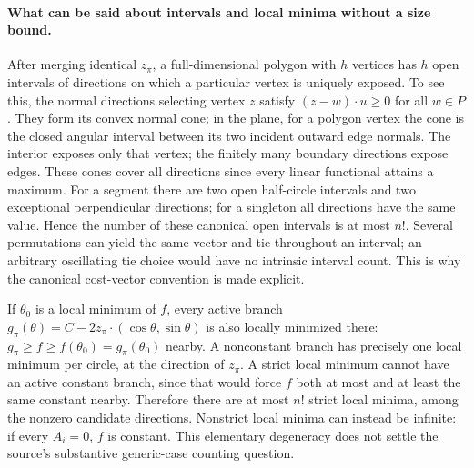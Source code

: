 \documentclass[11pt]{article}
\begin{document}
\paragraph{What can be said about intervals and local minima without a size bound.}
After merging identical $z_\pi$, a full-dimensional polygon with $h$ vertices
has $h$ open intervals of directions on which a particular vertex is uniquely
exposed. To see this, the normal directions selecting vertex $z$ satisfy
$(z-w)\cdot u\ge0$ for all $w\in P$. They form its convex normal cone;
in the plane, for a polygon vertex the cone is the closed angular interval
between its two incident outward edge normals. The interior exposes only
that vertex; the finitely many boundary directions expose edges. These cones
cover all directions since every linear functional attains a maximum. For
a segment there are two open half-circle intervals and two exceptional
perpendicular directions; for a singleton all directions have the same value.
Hence the number of these canonical open intervals is at most $n!$.
Several permutations can yield the same vector and tie throughout an interval;
an arbitrary oscillating tie choice would have no intrinsic interval count.
This is why the canonical cost-vector convention is made explicit.

If $\theta_0$ is a local minimum of $f$, every active branch
$g_\pi(\theta)=C-2z_\pi\cdot(\cos\theta,\sin\theta)$ is also locally
minimized there: $g_\pi\ge f\ge f(\theta_0)=g_\pi(\theta_0)$ nearby.
A nonconstant branch has precisely one local minimum per circle, at the
direction of $z_\pi$. A strict local minimum cannot have an active constant
branch, since that would force $f$ both at most and at least the same constant
nearby. Therefore there are at most $n!$ strict local minima, among the
nonzero candidate directions. Nonstrict local minima can instead be infinite:
if every $A_i=0$, $f$ is constant. This elementary degeneracy does not settle
the source's substantive generic-case counting question.
\end{document}
